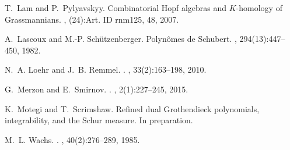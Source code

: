 \documentclass[12pt]{amsart}
\numberwithin{equation}{section}
\theoremstyle{definition}
\begin{document}
\begin{thebibliography}{10}
T.~Lam and P.~Pylyavskyy.
\newblock Combinatorial {H}opf algebras and {$K$}-homology of {G}rassmannians.
, (24):Art. ID rnm125, 48, 2007.

A.~Lascoux and M.-P. Sch\"{u}tzenberger.
\newblock Polyn\^{o}mes de {S}chubert.
, 294(13):447--450,
  1982.

N.~A. Loehr and J.~B. Remmel.
.
, 33(2):163–198, 2010.

G.~Merzon and E.~Smirnov.
.
, 2(1):227–245, 2015.

K.~Motegi and T.~Scrimshaw.
\newblock Refined dual Grothendieck polynomials, integrability, and the Schur measure.
\newblock In preparation.

M.~L. Wachs.
.
, 40(2):276–289,
  1985.

\end{thebibliography}
\end{document}
